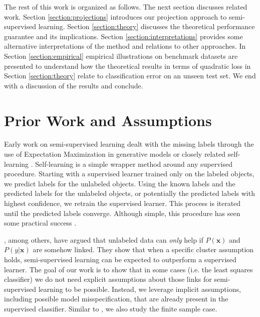 \documentclass[smallcondensed]{svjour3}\usepackage[]{graphicx}\usepackage[]{color}
\renewcommand{\vec}[1]{\mathbf{#1}}
\begin{document}
The rest of this work is organized as follows. The next section discusses related work. Section \ref{section:projections} introduces our projection approach to semi-supervised learning. Section \ref{section:theory} discusses the theoretical performance guarantee and its implications. Section \ref{section:interpretations} provides some alternative interpretations of the method and relations to other approaches. In Section \ref{section:empirical} empirical illustrations on benchmark datasets are presented to understand how the theoretical results in terms of quadratic loss in Section \ref{section:theory} relate to classification error on an unseen test set. We end with a discussion of the results and conclude.

\section{Prior Work and Assumptions}

Early work on semi-supervised learning dealt with the missing labels through the use of Expectation Maximization in generative models or closely related self-learning \citep{McLachlan1975}. Self-learning is a simple wrapper method around any supervised procedure. Starting with a supervised learner trained only on the labeled objects, we predict labels for the unlabeled objects. Using the known labels and the predicted labels for the unlabeled objects, or potentially the predicted labels with highest confidence, we retrain the supervised learner. This process is iterated until the predicted labels converge. Although simple, this procedure has seen some practical success \citep{Nigam2000}.

\citet{Singh2008}, among others, have argued that unlabeled data can \emph{only} help if $P(\vec{x})$ and $P(y|\vec{x})$ are somehow linked. They show that when a specific cluster assumption holds, semi-supervised learning can be expected to outperform a supervised learner. The goal of our work is to show that in some cases (i.e. the least squares classifier) we do not need explicit assumptions about those links for semi-supervised learning to be possible. Instead, we leverage implicit assumptions, including possible model misspecification, that are already present in the supervised classifier. Similar to \citet{Singh2008}, we also study the finite sample case.
\end{document}
